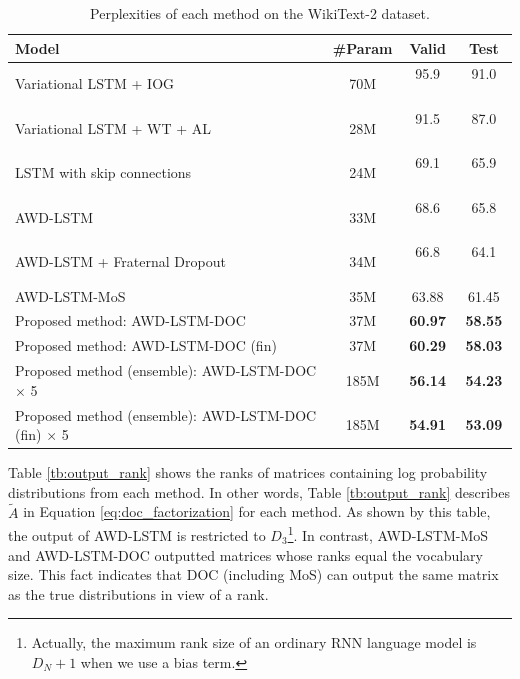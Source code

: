 \documentclass[11pt,a4paper]{article}
\begin{document}
\begin{table}[!t]
  \centering
  \small
  \begin{tabular}{| l | c | c c |} \hline
  Model & \#Param & Valid & Test \\ \hline
  Variational LSTM + IOG \cite{takase-suzuki-nagata:2017:I17-2} & 70M & 95.9  \ \  & 91.0 \ \  \\
  Variational LSTM + WT + AL \cite{DBLP:journals/corr/InanKS16} & 28M & 91.5  \ \ & 87.0 \ \  \\
  LSTM with skip connections \cite{DBLP:journals/corr/MelisDB17} & 24M & 69.1  \ \  & 65.9 \ \  \\
  AWD-LSTM \cite{merityRegOpt} & 33M & 68.6  \ \  & 65.8 \ \  \\
  AWD-LSTM + Fraternal Dropout \cite{fraternal} & 34M & 66.8  \ \  & 64.1 \ \  \\
  AWD-LSTM-MoS \cite{DBLP:journals/corr/abs-1711-03953} & 35M & 63.88 & 61.45 \\ \hline
  Proposed method: AWD-LSTM-DOC & 37M & {\bf 60.97} & {\bf 58.55} \\
  Proposed method: AWD-LSTM-DOC (fin) & 37M & {\bf 60.29} & {\bf 58.03} \\
  Proposed method (ensemble): AWD-LSTM-DOC $\times$ 5 & 185M & {\bf 56.14} & {\bf 54.23} \\
  Proposed method (ensemble): AWD-LSTM-DOC (fin) $\times$ 5 & 185M & {\bf 54.91} & {\bf 53.09} \\ \hline
  \end{tabular}
  \caption{Perplexities of each method on the WikiText-2 dataset.\label{tb:perplexityOnWikitext}}
\end{table}



Table \ref{tb:output_rank} shows the ranks of matrices containing log probability distributions from each method.
In other words, Table \ref{tb:output_rank} describes $\tilde{A}$ in Equation \ref{eq:doc_factorization} for each method.
As shown by this table, the output of AWD-LSTM is restricted to $D_3$\footnote{Actually, the maximum rank size of an ordinary RNN language model is $D_{N} + 1$ when we use a bias term.}.
In contrast, AWD-LSTM-MoS~\cite{DBLP:journals/corr/abs-1711-03953} and AWD-LSTM-DOC outputted matrices whose ranks equal the vocabulary size.
This fact indicates that DOC (including MoS) can output the same matrix as the true distributions in view of a rank.
\end{document}
